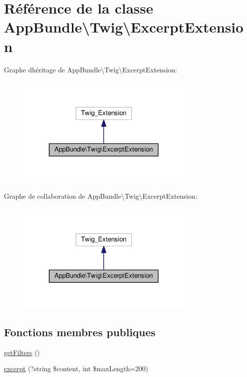 \hypertarget{classAppBundle_1_1Twig_1_1ExcerptExtension}{}\section{Référence de la classe App\+Bundle\textbackslash{}Twig\textbackslash{}Excerpt\+Extension}
\label{classAppBundle_1_1Twig_1_1ExcerptExtension}


Graphe d\textquotesingle{}héritage de App\+Bundle\textbackslash{}Twig\textbackslash{}Excerpt\+Extension\+:\nopagebreak
\begin{figure}[H]
\begin{center}
\leavevmode
\includegraphics[width=248pt]{classAppBundle_1_1Twig_1_1ExcerptExtension__inherit__graph}
\end{center}
\end{figure}


Graphe de collaboration de App\+Bundle\textbackslash{}Twig\textbackslash{}Excerpt\+Extension\+:\nopagebreak
\begin{figure}[H]
\begin{center}
\leavevmode
\includegraphics[width=248pt]{classAppBundle_1_1Twig_1_1ExcerptExtension__coll__graph}
\end{center}
\end{figure}
\subsection*{Fonctions membres publiques}
\begin{DoxyCompactItemize}
\item 
\hyperlink{classAppBundle_1_1Twig_1_1ExcerptExtension_aa607e8e11c8b6ac43c3996e8f86b4544}{get\+Filters} ()
\item 
\hyperlink{classAppBundle_1_1Twig_1_1ExcerptExtension_a60d918a9302749cdc79dd680f96955a1}{excerpt} (?string \$content, int \$max\+Length=200)
\end{DoxyCompactItemize}


